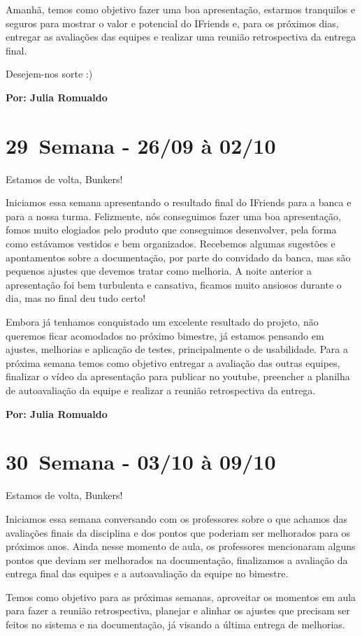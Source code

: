 Amanhã, temos como objetivo fazer uma boa apresentação, estarmos tranquilos e seguros para mostrar o valor e potencial do IFriends e, para os próximos dias, entregar as avaliações das equipes e realizar uma reunião retrospectiva da entrega final.

Desejem-nos sorte :)

\textbf{Por: Julia Romualdo}

\section{29\textordfeminine \, Semana - 26/09 à 02/10}
Estamos de volta, Bunkers!

Iniciamos essa semana apresentando o resultado final do IFriends para a banca e para a nossa turma. Felizmente, nós conseguimos fazer uma boa apresentação, fomos muito elogiados pelo produto que conseguimos desenvolver, pela forma como estávamos vestidos e bem organizados. Recebemos algumas sugestões e apontamentos sobre a documentação, por parte do convidado da banca, mas são pequenos ajustes que devemos tratar como melhoria. A noite anterior a apresentação foi bem turbulenta e cansativa, ficamos muito ansiosos durante o dia, mas no final deu tudo certo!

Embora já tenhamos conquistado um excelente resultado do projeto, não queremos ficar acomodados no próximo bimestre, já estamos pensando em ajustes, melhorias e aplicação de testes, principalmente o de usabilidade. 
Para a próxima semana temos como objetivo entregar a avaliação das outras equipes, finalizar o vídeo da apresentação para publicar no \gls{youtube}, preencher a planilha de autoavaliação da equipe e realizar a reunião retrospectiva da entrega.

\textbf{Por: Julia Romualdo}

\section{30\textordfeminine \, Semana - 03/10 à 09/10}
Estamos de volta, Bunkers!

Iniciamos essa semana conversando com os professores sobre o que achamos das avaliações finais da disciplina e dos pontos que poderiam ser melhorados para os próximos anos. Ainda nesse momento de aula, os professores mencionaram alguns pontos que deviam ser melhorados na documentação, finalizamos a avaliação da entrega final das equipes e a autoavaliação da equipe no bimestre.

Temos como objetivo para as próximas semanas, aproveitar os momentos em aula para fazer a reunião retrospectiva, planejar e alinhar os ajustes que precisam ser feitos no sistema e na documentação, já visando a última entrega de melhorias. 

